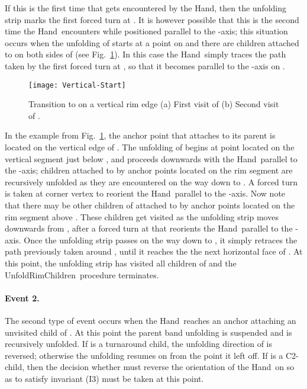 \documentclass[11pt]{article}
\newcommand\hand{{\sc Hand}}
\newcommand\unfoldrim{{\sc UnfoldRimChildren}}
\begin{document}
If this is the first time that  gets encountered by the \hand, then the unfolding strip marks the first forced turn at . It is however possible that this is the second time the \hand\ encounters  while positioned parallel to the -axis; this situation occurs when the unfolding of  starts at a point  on  and there are children attached to  on both sides of  (see Fig.~\ref{fig:verticalstart}). In this case the \hand\ simply traces the path taken by the first forced turn at , so that it becomes parallel to the -axis on . 

\begin{figure}[htbp]
\centering
\texttt{[image: Vertical-Start]}
\caption{Transition to  on a vertical rim edge (a) First visit of  (b) Second visit of .}
\label{fig:verticalstart}
\end{figure}

In the example from Fig.~\ref{fig:verticalstart}, the anchor point   that attaches  to its parent is located on the vertical edge  of . The unfolding of  begins at point  located on the vertical segment  just below , and proceeds downwards with the \hand\ parallel to the -axis; children attached to  by anchor points located on the rim segment  are recursively unfolded as they are encountered on the way down to . A forced turn is taken at corner vertex  to reorient the \hand\ parallel to the -axis. Now note that there may be other children of  attached to  by anchor points located on the rim segment  above . These children get visited as the unfolding strip moves downwards from , after a forced turn at  that reorients the \hand\ parallel to the -axis. Once the unfolding strip passes  on the way down to , it simply retraces the path previously taken around , until it reaches the the next horizontal face of . At this point, the unfolding strip has visited all children of  and the 
\unfoldrim\ procedure terminates. 

\paragraph{Event 2.} The second type of event occurs when the \hand\ reaches an anchor attaching an unvisited child  of . At this point the parent band unfolding is suspended and  is recursively unfolded. If  is a turnaround child, the unfolding direction of  is reversed; otherwise the unfolding resumes on  from the point it left off. If  is a C2-child, then the decision whether  must reverse the orientation of the \hand\ on  so as to satisfy invariant (I3) must be taken at this point. 
\end{document}
